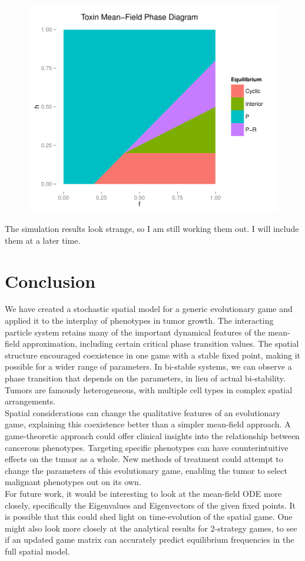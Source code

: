 \documentclass[12pt]{report}
\begin{document}
\begin{figure}
\centering
\includegraphics[width = 0.8 \linewidth]{Diagrams/toxin_phase-mf}
\end{figure}
The simulation results look strange, so I am still working them out. I will include them at a later time. 



\chapter*{Conclusion}
We have created a stochastic spatial model for a generic evolutionary game and applied it to the interplay of phenotypes in tumor growth. The interacting particle system retains many of the important dynamical features of the mean-field approximation, including certain critical phase transition values. The spatial structure encouraged coexistence in one game with a stable fixed point, making it possible for a wider range of parameters. In bi-stable systems, we can observe a phase transition that depends on the parameters, in lieu of actual bi-stability. Tumors are famously heterogeneous, with multiple cell types in complex spatial arrangements. \\

Spatial considerations can change the qualitative features of an evolutionary game, explaining this coexistence better than a simpler mean-field approach. A game-theoretic approach could offer clinical insights into the relationship between cancerous phenotypes. Targeting specific phenotypes can have counterintuitive effects on the tumor as a whole. New methods of treatment could attempt to change the parameters of this evolutionary game, enabling the tumor to select malignant phenotypes out on its own.\\

For future work, it would be interesting to look at the mean-field ODE more closely, specifically the Eigenvalues and Eigenvectors of the given fixed points. It is possible that this could shed light on time-evolution of the spatial game. One might also look more closely at the analytical results for 2-strategy games, to see if an updated game matrix can accurately predict equilibrium frequencies in the full spatial model. 



\newpage 

\end{document}
